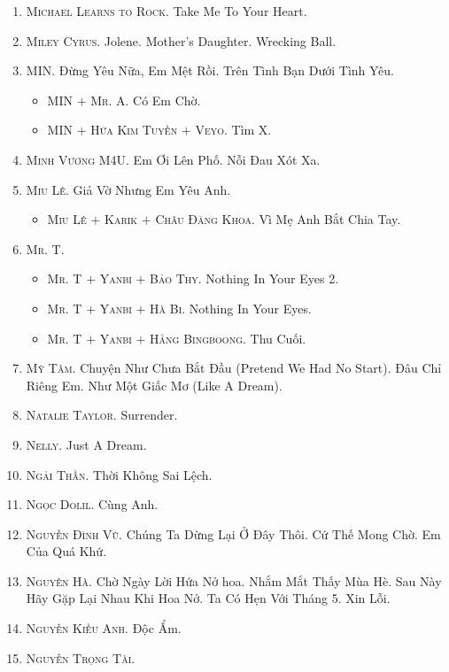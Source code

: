 \documentclass{article}
\numberwithin{equation}{section}
\begin{document}
\begin{enumerate}
\begin{itemize}
	\end{itemize}
	\item \textsc{Michael Learns to Rock.} Take Me To Your Heart.
	\item \textsc{Miley Cyrus.} Jolene. Mother's Daughter. Wrecking Ball.
	\item \textsc{MIN.} Đừng Yêu Nữa, Em Mệt Rồi. Trên Tình Bạn Dưới Tình Yêu.
	\begin{itemize}
		\item \textsc{MIN $+$ Mr. A.} Có Em Chờ.
		\item \textsc{MIN $+$ Hứa Kim Tuyền $+$ Veyo.} Tìm X.
	\end{itemize}
	\item \textsc{Minh Vương M4U.} Em Ơi Lên Phố. Nỗi Đau Xót Xa.
	\item \textsc{Miu Lê.} Giả Vờ Nhưng Em Yêu Anh.
	\begin{itemize}
		\item \textsc{Miu Lê $+$ Karik $+$ Châu Đăng Khoa.} Vì Mẹ Anh Bắt Chia Tay.
	\end{itemize}
	\item \textsc{Mr. T.}
	\begin{itemize}
		\item \textsc{Mr. T $+$ Yanbi $+$ Bảo Thy.} Nothing In Your Eyes 2.
		\item \textsc{Mr. T $+$ Yanbi $+$ Hà Bi.} Nothing In Your Eyes.
		\item \textsc{Mr. T $+$ Yanbi $+$ Hằng Bingboong.} Thu Cuối.
	\end{itemize}
	\item \textsc{Mỹ Tâm.} Chuyện Như Chưa Bắt Đầu (Pretend We Had No Start). Đâu Chỉ Riêng Em. Như Một Giấc Mơ (Like A Dream).
	\item \textsc{Natalie Taylor.} Surrender.
	\item \textsc{Nelly.} Just A Dream.
	\item \textsc{Ngải Thần.} Thời Không Sai Lệch.
	\item \textsc{Ngọc Dolil.} Cùng Anh.
	\item \textsc{Nguyễn Đình Vũ.} Chúng Ta Dừng Lại Ở Đây Thôi. Cứ Thế Mong Chờ. Em Của Quá Khứ.
	\item \textsc{Nguyên Hà.} Chờ Ngày Lời Hứa Nở hoa. Nhắm Mắt Thấy Mùa Hè. Sau Này Hãy Gặp Lại Nhau Khi Hoa Nở. Ta Có Hẹn Với Tháng 5. Xin Lỗi.
	\item \textsc{Nguyễn Kiều Anh.} Độc Ẩm.
	\item \textsc{Nguyễn Trọng Tài.}
	\begin{itemize}

\end{itemize}
\end{enumerate}
\end{document}
